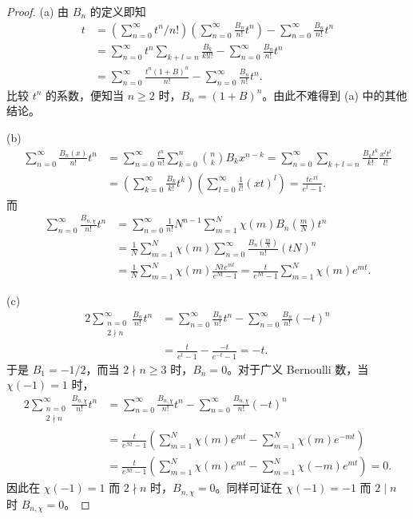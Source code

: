 \begin{proof}
(a) 由 $B_n$ 的定义即知
\begin{align*}
  t&=\left(\sum_{n=0}^{\infty}t^n/n!\right)\left(\sum_{n=0}^{\infty}\frac{B_n}{n!}t^n\right)-\sum_{n=0}^{\infty}\frac{B_n}{n!}t^n\\
  &=\sum_{n=0}^{\infty}t^n\sum_{k+l=n}\frac{B_k}{k!l!}-\sum_{n=0}^{\infty}\frac{B_n}{n!}t^n\\
  &=\sum_{n=0}^{\infty}\frac{t^n(1+B)^n}{n!}-\sum_{n=0}^{\infty}\frac{B_n}{n!}t^n.
\end{align*}
比较 $t^n$ 的系数，便知当 $n\geqslant 2$ 时，$B_n=(1+B)^n$。由此不难得到 (a) 中的其他结论。

(b)
\begin{align*}
  \sum_{n=0}^{\infty}\frac{B_n(x)}{n!}t^n
  &=\sum_{n=0}^{\infty}\frac{t^n}{n!}\sum_{k=0}^{n}\binom{n}{k}B_kx^{n-k}
  =\sum_{n=0}^{\infty}\sum_{k+l=n}\frac{B_kt^k}{k!}\frac{x^lt^l}{l!}\\
  &=\left(\sum_{k=0}^{\infty}\frac{B_k}{k!}t^k\right)\left(\sum_{l=0}^{\infty}\frac{1}{l!}(xt)^l\right)=\frac{te^{xt}}{e^t-1}.
\end{align*}
而
\begin{align*}
  \sum_{n=0}^{\infty}\frac{B_{n,\chi}}{n!}t^n
  &=\sum_{n=0}^{\infty}\frac{1}{n!}N^{n-1}\sum_{m=1}^{N}\chi(m)B_n\left(\frac{m}{N}\right)t^n\\
  &=\frac{1}{N}\sum_{m=1}^{N}\chi(m)\sum_{n=0}^{\infty}\frac{B_n\left(\frac{m}{N}\right)}{n!}(tN)^n\\
  &=\frac{1}{N}\sum_{m=1}^{N}\chi(m)\frac{Nte^{mt}}{e^{Nt}-1}
  =\frac{t}{e^{Nt}-1}\sum_{m=1}^{N}\chi(m)e^{mt}.
\end{align*}

(c)
\begin{align*}
  2\sum_{\substack{n=0\\ 2\nmid n}}^{\infty}\frac{B_n}{n!}t^n
  &=\sum_{n=0}^{\infty}\frac{B_n}{n!}t^n-\sum_{n=0}^{\infty}\frac{B_n}{n!}(-t)^n\\
  &=\frac{t}{e^t-1}-\frac{-t}{e^{-t}-1}=-t.
\end{align*}
于是 $B_1=-1/2$，而当 $2\nmid n\geqslant 3$ 时，$B_n=0$。对于广义 Bernoulli 数，当 $\chi(-1)=1$ 时，
\begin{align*}
  2\sum_{\substack{n=0\\ 2\nmid n}}^{\infty}\frac{B_{n,\chi}}{n!}t^n
  &=\sum_{n=0}^{\infty}\frac{B_{n,\chi}}{n!}t^n-\sum_{n=0}^{\infty}\frac{B_{n,\chi}}{n!}(-t)^n\\
  &=\frac{t}{e^{Nt}-1}\left(\sum_{m=1}^{N}\chi(m)e^{mt}-\sum_{m=1}^{N}\chi(m)e^{-mt}\right)\\
  &=\frac{t}{e^{Nt}-1}\left(\sum_{m=1}^{N}\chi(m)e^{mt}-\sum_{m=1}^{N}\chi(-m)e^{mt}\right)=0.
\end{align*}
因此在 $\chi(-1)=1$ 而 $2\nmid n$ 时，$B_{n,\chi}=0$。同样可证在 $\chi(-1)=-1$ 而 $2\mid n$ 时 $B_{n,\chi}=0$。
\end{proof}

